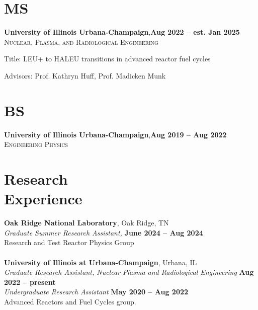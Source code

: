 \documentclass[margin,line]{resume}
\begin{document}
\begin{resume}
    \section{\mysidestyle MS}
    \textbf{University of Illinois Urbana-Champaign},\hfill\textbf{Aug 2022 -- est. Jan 2025}\\
    \textsc{Nuclear, Plasma, and Radiological Engineering}\vspace{1mm}
    \begin{list2}
        \item Title: LEU+ to HALEU transitions in advanced reactor fuel cycles
        \item Advisors:  Prof. Kathryn Huff, Prof. Madicken Munk
    \end{list2}\vspace{-1.5mm}
    \section{\mysidestyle BS}
    \textbf{University of Illinois Urbana-Champaign},\hfill\textbf{Aug 2019 -- Aug 2022}\\
    \textsc{Engineering Physics}\vspace{-3mm}
    \section{\mysidestyle Research\\Experience}
    \textbf{Oak Ridge National Laboratory}, Oak Ridge, TN\\
                \textsl{Graduate Summer Research Assistant,} \hfill \textbf{June 2024 -- Aug 2024}\\
                Research and Test Reactor Physics Group\\\\
    \textbf{University of Illinois at Urbana-Champaign}, Urbana, IL\\
                \textsl{Graduate Research Assistant, Nuclear Plasma and Radiological Engineering} \hfill \textbf{Aug 2022 -- present}\\
                \textsl{Undergraduate Research Assistant} \hfill \textbf{May 2020 -- Aug 2022}\\
                Advanced Reactors and Fuel Cycles group.




\end{resume}
\end{document}
